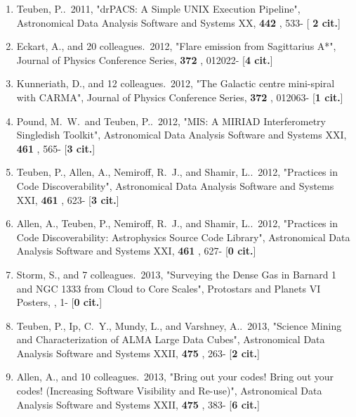 \documentclass[11pt,letterpaper]{article}
\begin{document}
\begin{enumerate}[resume,label=\textbf{\arabic*}.]
\item  
Teuben, P..\  2011,  "drPACS: A Simple UNIX Execution Pipeline", 
Astronomical Data Analysis Software and Systems XX,  {\bf 442} , 533- [{\bf 
2 cit.}] 



\item  
Eckart, A., and 20 colleagues.\  2012,  "Flare emission from Sagittarius 
A*", Journal of Physics Conference Series,  {\bf 372} , 012022- [{\bf 4 
cit.}] 

\item  
Kunneriath, D., and 12 colleagues.\  2012,  "The Galactic centre 
mini-spiral with CARMA", Journal of Physics Conference Series,  {\bf 372} , 
012063- [{\bf 1 cit.}] 


\item  
Pound, M.~W.~and Teuben, P..\  2012,  "MIS: A MIRIAD Interferometry 
Singledish Toolkit", Astronomical Data Analysis Software and Systems XXI,  
{\bf 461} , 565- [{\bf 3 cit.}] 

\item  
Teuben, P., Allen, A., Nemiroff, R.~J., and Shamir, L..\  2012,  "Practices 
in Code Discoverability", Astronomical Data Analysis Software and Systems 
XXI,  {\bf 461} , 623- [{\bf 3 cit.}] 

\item  
Allen, A., Teuben, P., Nemiroff, R.~J., and Shamir, L..\  2012,  "Practices 
in Code Discoverability: Astrophysics Source Code Library", Astronomical 
Data Analysis Software and Systems XXI,  {\bf 461} , 627- [{\bf 0 cit.}] 



\item  
Storm, S., and 7 colleagues.\  2013,  "Surveying the Dense Gas in Barnard 1 
and NGC 1333 from Cloud to Core Scales", Protostars and Planets VI Posters,  
, 1- [{\bf 0 cit.}] 

\item  
Teuben, P., Ip, C.~Y., Mundy, L., and Varshney, A..\  2013,  "Science 
Mining and Characterization of ALMA Large Data Cubes", Astronomical Data 
Analysis Software and Systems XXII,  {\bf 475} , 263- [{\bf 2 cit.}] 

\item  
Allen, A., and 10 colleagues.\  2013,  "Bring out your codes! Bring out 
your codes! (Increasing Software Visibility and Re-use)", Astronomical Data 
Analysis Software and Systems XXII,  {\bf 475} , 383- [{\bf 6 cit.}] 


\end{enumerate}
\end{document}
